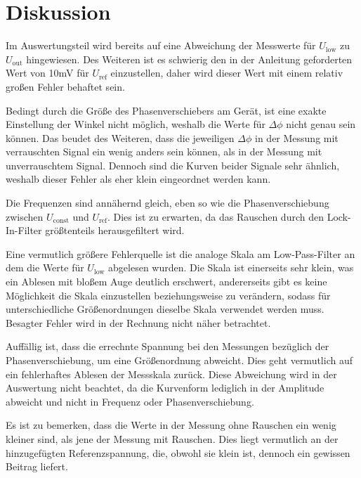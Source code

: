\section{Diskussion}
\label{sec:Diskussion}
Im Auswertungsteil wird bereits auf eine Abweichung der Messwerte für $U_\text{low}$ zu $U_\text{out}$ hingewiesen.
Des Weiteren ist es schwierig den in der Anleitung geforderten Wert von 10mV für $U_\text{ref}$ einzustellen, daher wird dieser Wert mit einem relativ großen Fehler behaftet sein.

Bedingt durch die Größe des Phasenverschiebers am Gerät, ist eine exakte Einstellung der Winkel nicht möglich, weshalb die Werte für $\Delta\phi$ nicht genau sein können.
Das beudet des Weiteren, dass die jeweiligen $\Delta\phi$ in der Messung mit verrauschten Signal ein wenig anders sein können, als in der Messung mit unverrauschtem Signal.
Dennoch sind die Kurven beider Signale sehr ähnlich, weshalb dieser Fehler als eher klein eingeordnet werden kann.

Die Frequenzen sind annähernd gleich, eben so wie die Phasenverschiebung zwischen $U_\text{const}$ und $U_\text{ref}$. Dies ist zu erwarten, da das Rauschen durch den Lock-In-Filter größtenteils herausgefiltert wird.

Eine vermutlich größere Fehlerquelle ist die analoge Skala am Low-Pass-Filter an dem die Werte für $U_\text{low}$ abgelesen wurden. Die Skala ist einerseits sehr klein, was ein Ablesen mit bloßem Auge deutlich erschwert,
andererseits gibt es keine Möglichkeit die Skala einzustellen beziehungsweise zu verändern, sodass für unterschiedliche Größenordnungen dieselbe Skala verwendet werden muss. Besagter Fehler wird in der Rechnung nicht näher betrachtet.

Auffällig ist, dass die errechnte Spannung bei den Messungen bezüglich der Phasenverschiebung, um eine Größenordnung abweicht. Dies geht vermutlich auf ein fehlerhaftes Ablesen der Messskala zurück. Diese Abweichung wird in der Auswertung nicht beachtet, da die Kurvenform lediglich in der Amplitude abweicht und nicht in Frequenz oder Phasenverschiebung.

Es ist zu bemerken, dass die Werte in der Messung ohne Rauschen ein wenig kleiner sind, als jene der Messung mit Rauschen. Dies liegt vermutlich an der hinzugefügten Referenzspannung, die, obwohl sie klein ist, dennoch ein gewissen Beitrag liefert.

